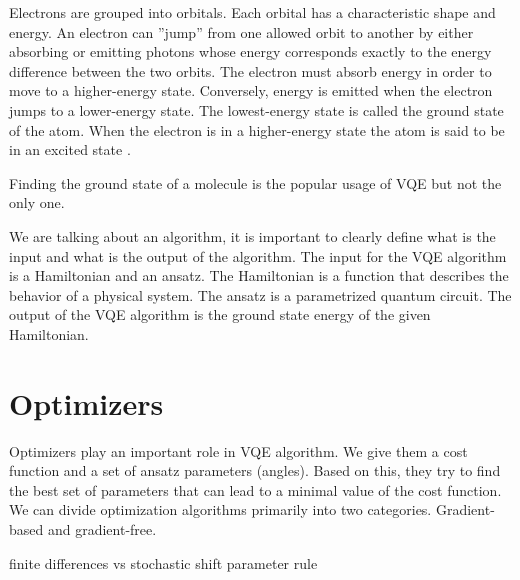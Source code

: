 Electrons are grouped into orbitals. Each orbital has a characteristic shape and energy. An electron can ''jump'' from one allowed orbit to another by either absorbing or emitting photons whose energy corresponds exactly to the energy difference between the two orbits. The electron must absorb energy in order to move to a higher-energy state. Conversely, energy is emitted when the electron jumps to a lower-energy state. The lowest-energy state is called the
ground state of the atom. When the electron is in a higher-energy state the atom is said to be in an excited state \cite{chemistry}.


Finding the ground state of a molecule is the popular usage of VQE but not the only one.


We are talking about an algorithm, it is important to clearly define what is the input and what is the output of the algorithm. The input for the VQE algorithm is a Hamiltonian and an ansatz. The Hamiltonian is a function that describes the behavior of a physical system. The ansatz is a parametrized quantum circuit. The output of the VQE algorithm is the ground state energy of the given Hamiltonian.


\section{Optimizers}
Optimizers play an important role in VQE algorithm. We give them a cost function and a set of ansatz parameters (angles). Based on this, they try to find the best set of parameters that can lead to a minimal value of the cost function. We can divide optimization algorithms primarily into two categories. Gradient-based and gradient-free.

finite differences vs stochastic shift parameter rule